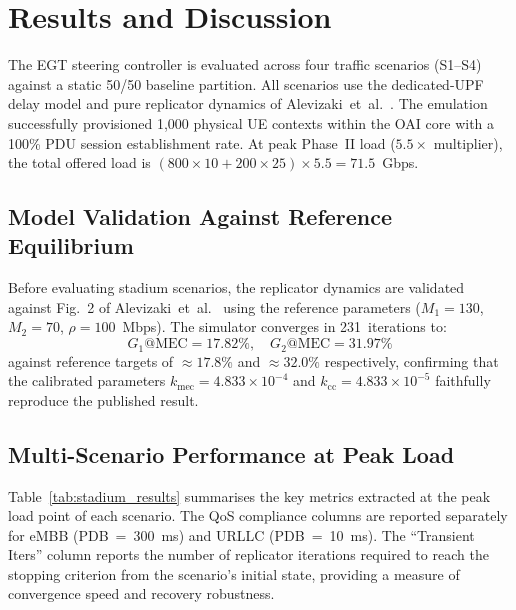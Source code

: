 \documentclass[conference]{IEEEtran}
\begin{document}
\section{Results and Discussion}
\label{sec:results}

The EGT steering controller is evaluated across four traffic
scenarios (S1--S4) against a static 50/50 baseline partition.
All scenarios use the dedicated-UPF delay model and pure
replicator dynamics of Alevizaki~et~al.~\cite{Alevizaki2021upf}. The emulation successfully provisioned 1,000 physical UE contexts within the OAI core with a 100\% PDU session establishment rate.
At peak Phase~II load ($5.5\times$ multiplier), the total offered
load is $(800 \times 10 + 200 \times 25) \times 5.5 = 71.5$~Gbps.

\subsection{Model Validation Against Reference Equilibrium}

Before evaluating stadium scenarios, the replicator dynamics
are validated against Fig.~2 of Alevizaki~et~al.~\cite{Alevizaki2021upf}
using the reference parameters ($M_1=130$, $M_2=70$,
$\rho=100$~Mbps). The simulator converges in 231~iterations to:
\begin{equation*}
  G_1\text{@MEC} = 17.82\%,\quad G_2\text{@MEC} = 31.97\%
\end{equation*}
against reference targets of $\approx 17.8\%$ and $\approx 32.0\%$
respectively, confirming that the calibrated parameters
$k_\text{mec} = 4.833\times10^{-4}$ and $k_\text{cc} = 4.833\times10^{-5}$
faithfully reproduce the published result.

\subsection{Multi-Scenario Performance at Peak Load}

Table~\ref{tab:stadium_results} summarises the key metrics extracted
at the peak load point of each scenario. The QoS compliance columns
are reported separately for eMBB (PDB~=~300~ms) and URLLC
(PDB~=~10~ms). The ``Transient Iters'' column reports the number
of replicator iterations required to reach the stopping criterion
from the scenario's initial state, providing a measure of
convergence speed and recovery robustness.
\end{document}
